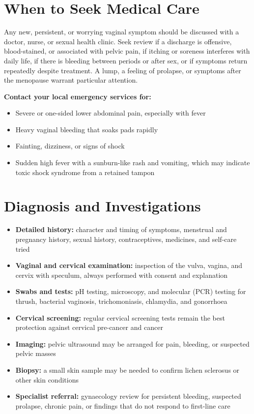 \section*{When to Seek Medical Care}
Any new, persistent, or worrying vaginal symptom should be discussed with a doctor, nurse, or sexual health clinic. Seek review if a discharge is offensive, blood-stained, or associated with pelvic pain, if itching or soreness interferes with daily life, if there is bleeding between periods or after sex, or if symptoms return repeatedly despite treatment. A lump, a feeling of prolapse, or symptoms after the menopause warrant particular attention.

\textbf{Contact your local emergency services for:}
\begin{itemize}
    \item Severe or one-sided lower abdominal pain, especially with fever
    \item Heavy vaginal bleeding that soaks pads rapidly
    \item Fainting, dizziness, or signs of shock
    \item Sudden high fever with a sunburn-like rash and vomiting, which may indicate toxic shock syndrome from a retained tampon
\end{itemize}

\section*{Diagnosis and Investigations}
\begin{itemize}
    \item \textbf{Detailed history:} character and timing of symptoms, menstrual and pregnancy history, sexual history, contraceptives, medicines, and self-care tried
    \item \textbf{Vaginal and cervical examination:} inspection of the vulva, vagina, and cervix with speculum, always performed with consent and explanation
    \item \textbf{Swabs and tests:} pH testing, microscopy, and molecular (PCR) testing for thrush, bacterial vaginosis, trichomoniasis, chlamydia, and gonorrhoea
    \item \textbf{Cervical screening:} regular cervical screening tests remain the best protection against cervical pre-cancer and cancer
    \item \textbf{Imaging:} pelvic ultrasound may be arranged for pain, bleeding, or suspected pelvic masses
    \item \textbf{Biopsy:} a small skin sample may be needed to confirm lichen sclerosus or other skin conditions
    \item \textbf{Specialist referral:} gynaecology review for persistent bleeding, suspected prolapse, chronic pain, or findings that do not respond to first-line care
\end{itemize}

